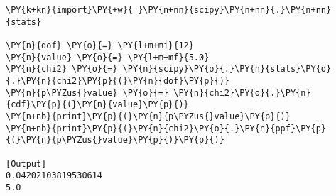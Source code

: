 \begin{Verbatim}[label=\makebox{\href{https://github.com/unipi-physics-labs/statnotes/tree/main/snippy/scipy.stats.chi2.py}{https://github.com/.../scipy.stats.chi2.py}},commandchars=\\\{\}]
\PY{k+kn}{import}\PY{+w}{ }\PY{n+nn}{scipy}\PY{n+nn}{.}\PY{n+nn}{stats}

\PY{n}{dof} \PY{o}{=} \PY{l+m+mi}{12}
\PY{n}{value} \PY{o}{=} \PY{l+m+mf}{5.0}
\PY{n}{chi2} \PY{o}{=} \PY{n}{scipy}\PY{o}{.}\PY{n}{stats}\PY{o}{.}\PY{n}{chi2}\PY{p}{(}\PY{n}{dof}\PY{p}{)}
\PY{n}{p\PYZus{}value} \PY{o}{=} \PY{n}{chi2}\PY{o}{.}\PY{n}{cdf}\PY{p}{(}\PY{n}{value}\PY{p}{)}
\PY{n+nb}{print}\PY{p}{(}\PY{n}{p\PYZus{}value}\PY{p}{)}
\PY{n+nb}{print}\PY{p}{(}\PY{n}{chi2}\PY{o}{.}\PY{n}{ppf}\PY{p}{(}\PY{n}{p\PYZus{}value}\PY{p}{)}\PY{p}{)}

[Output]
0.04202103819530614
5.0
\end{Verbatim}
